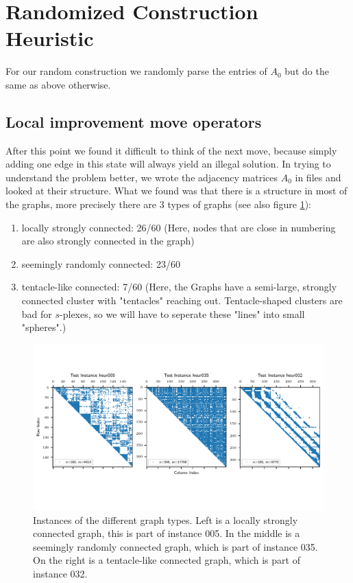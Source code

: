 \pagebreak

\section{Randomized Construction Heuristic}

For our random construction we randomly parse the entries of $A_0$ but do the same as above otherwise.

\subsection{Local improvement move operators}
After this point we found it difficult to think of the next move, because simply adding one edge in this state 
will always yield an illegal solution. In trying to understand the problem better, we wrote the adjacency 
matrices $A_0$ in files and looked at their structure. What we found was that there is a structure in most of the 
graphs, more precisely there are 3 types of graphs (see also figure \ref{fig:types}):

\begin{enumerate}
    \item locally strongly connected: 26/60 (Here, nodes that are close in numbering are also strongly connected 
    in the graph)
    \item seemingly randomly connected: 23/60
    \item tentacle-like connected: 7/60 (Here, the Graphs have a semi-large, strongly 
    connected cluster with "tentacles" reaching out. Tentacle-shaped clusters are bad for $s$-plexes, 
    so we will have to seperate these "lines" into small "spheres".)
\end{enumerate}

\begin{figure}[h]
\centering
\includegraphics[width=\linewidth, trim= {0 1.8cm 0 1.8cm}, clip]{figures/spy_adjacency.pdf}
\caption{\label{fig:types}Instances of the different graph types. Left is a locally strongly 
connected graph, this is part of instance 005. In the middle is a seemingly randomly connected graph, 
which is part of instance 035. On the right is a tentacle-like connected graph, which is part of instance 032.}
\end{figure}

